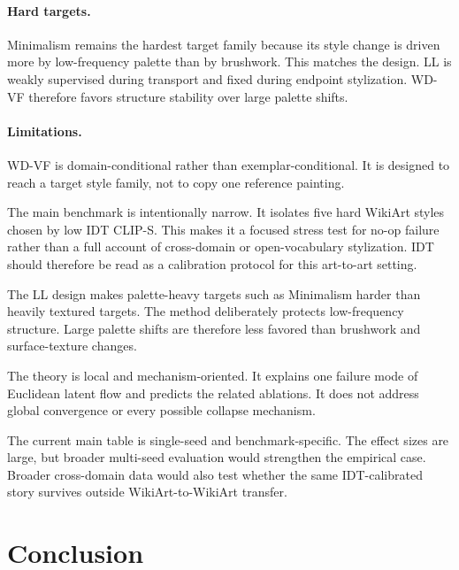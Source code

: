 \documentclass[letterpaper]{article}
\begin{document}
\paragraph{Hard targets.}
Minimalism remains the hardest target family because its style change is driven more by low-frequency palette than by brushwork.
This matches the design.
LL is weakly supervised during transport and fixed during endpoint stylization.
WD-VF therefore favors structure stability over large palette shifts.

\paragraph{Limitations.}
WD-VF is domain-conditional rather than exemplar-conditional.
It is designed to reach a target style family, not to copy one reference painting.

The main benchmark is intentionally narrow.
It isolates five hard WikiArt styles chosen by low IDT CLIP-S.
This makes it a focused stress test for no-op failure rather than a full account of cross-domain or open-vocabulary stylization.
IDT should therefore be read as a calibration protocol for this art-to-art setting.

The LL design makes palette-heavy targets such as Minimalism harder than heavily textured targets.
The method deliberately protects low-frequency structure.
Large palette shifts are therefore less favored than brushwork and surface-texture changes.

The theory is local and mechanism-oriented.
It explains one failure mode of Euclidean latent flow and predicts the related ablations.
It does not address global convergence or every possible collapse mechanism.

The current main table is single-seed and benchmark-specific.
The effect sizes are large, but broader multi-seed evaluation would strengthen the empirical case.
Broader cross-domain data would also test whether the same IDT-calibrated story survives outside WikiArt-to-WikiArt transfer.

\section{Conclusion}
\end{document}
